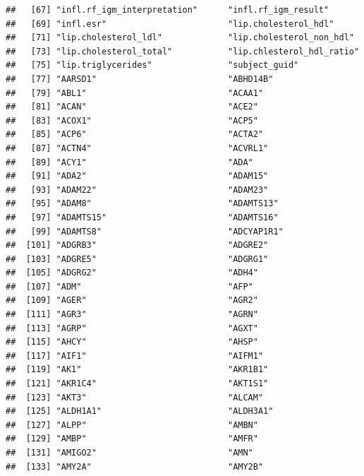\documentclass[
]{article}
\begin{document}
\begin{verbatim}
##   [67] "infl.rf_igm_interpretation"      "infl.rf_igm_result"             
##   [69] "infl.esr"                        "lip.cholesterol_hdl"            
##   [71] "lip.cholesterol_ldl"             "lip.cholesterol_non_hdl"        
##   [73] "lip.cholesterol_total"           "lip.chlesterol_hdl_ratio"       
##   [75] "lip.triglycerides"               "subject_guid"                   
##   [77] "AARSD1"                          "ABHD14B"                        
##   [79] "ABL1"                            "ACAA1"                          
##   [81] "ACAN"                            "ACE2"                           
##   [83] "ACOX1"                           "ACP5"                           
##   [85] "ACP6"                            "ACTA2"                          
##   [87] "ACTN4"                           "ACVRL1"                         
##   [89] "ACY1"                            "ADA"                            
##   [91] "ADA2"                            "ADAM15"                         
##   [93] "ADAM22"                          "ADAM23"                         
##   [95] "ADAM8"                           "ADAMTS13"                       
##   [97] "ADAMTS15"                        "ADAMTS16"                       
##   [99] "ADAMTS8"                         "ADCYAP1R1"                      
##  [101] "ADGRB3"                          "ADGRE2"                         
##  [103] "ADGRE5"                          "ADGRG1"                         
##  [105] "ADGRG2"                          "ADH4"                           
##  [107] "ADM"                             "AFP"                            
##  [109] "AGER"                            "AGR2"                           
##  [111] "AGR3"                            "AGRN"                           
##  [113] "AGRP"                            "AGXT"                           
##  [115] "AHCY"                            "AHSP"                           
##  [117] "AIF1"                            "AIFM1"                          
##  [119] "AK1"                             "AKR1B1"                         
##  [121] "AKR1C4"                          "AKT1S1"                         
##  [123] "AKT3"                            "ALCAM"                          
##  [125] "ALDH1A1"                         "ALDH3A1"                        
##  [127] "ALPP"                            "AMBN"                           
##  [129] "AMBP"                            "AMFR"                           
##  [131] "AMIGO2"                          "AMN"                            
##  [133] "AMY2A"                           "AMY2B"                          

\end{verbatim}
\end{document}
